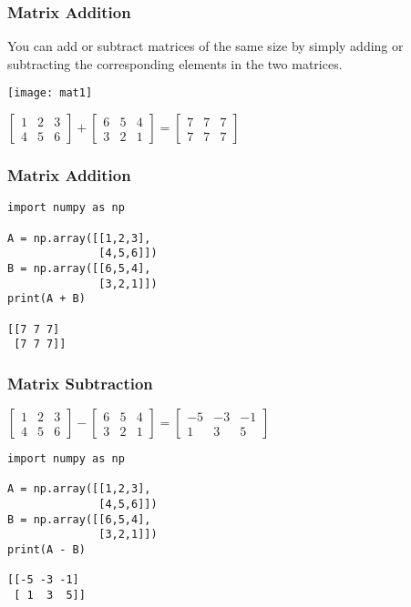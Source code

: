  \begin{frame}[fragile] \frametitle{Matrix Addition}
 You can
add or subtract matrices of the same size by simply adding or subtracting the
corresponding elements in the two matrices. 

\begin{center}
\texttt{[image: mat1]}
\end{center}

$\begin{bmatrix}1 & 2 & 3 \\4 & 5 & 6\end{bmatrix}+ \begin{bmatrix}6 & 5 & 4 \\3 & 2 & 1\end{bmatrix} = \begin{bmatrix}7 & 7 & 7 \\7 & 7 & 7\end{bmatrix}$
\end{frame}

  \begin{frame}[fragile]\frametitle{Matrix Addition}
 
\begin{lstlisting}
import numpy as np

A = np.array([[1,2,3],
              [4,5,6]])
B = np.array([[6,5,4],
              [3,2,1]])
print(A + B)

[[7 7 7]
 [7 7 7]]
\end{lstlisting}

\end{frame}

  \begin{frame}[fragile]\frametitle{Matrix Subtraction}
 
 $\begin{bmatrix}1 & 2 & 3 \\4 & 5 & 6\end{bmatrix}- \begin{bmatrix}6 & 5 & 4 \\3 & 2 & 1\end{bmatrix} = \begin{bmatrix}-5 & -3 & -1 \\1 & 3 & 5\end{bmatrix}$
\begin{lstlisting}
import numpy as np

A = np.array([[1,2,3],
              [4,5,6]])
B = np.array([[6,5,4],
              [3,2,1]])
print(A - B)

[[-5 -3 -1]
 [ 1  3  5]]
\end{lstlisting}

\end{frame}


